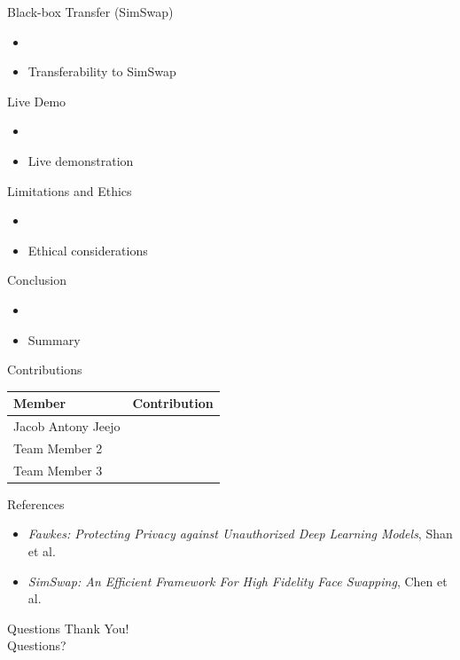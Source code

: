 \documentclass[aspectratio=169]{beamer}
\begin{document}
\begin{frame}{Black-box Transfer (SimSwap)}
    \begin{itemize}
        \item %
        \item Transferability to SimSwap
    \end{itemize}
\end{frame}

\begin{frame}{Live Demo}
    \begin{itemize}
        \item %
        \item Live demonstration
    \end{itemize}
\end{frame}

\begin{frame}{Limitations and Ethics}
    \begin{itemize}
        \item %
        \item Ethical considerations
    \end{itemize}
\end{frame}

\begin{frame}{Conclusion}
    \begin{itemize}
        \item %
        \item Summary
    \end{itemize}
\end{frame}

\begin{frame}{Contributions}
    \begin{table}
        \centering
        \begin{tabular}{ll}
            \toprule
            \textbf{Member} & \textbf{Contribution} \\
            \midrule
            Jacob Antony Jeejo & \\ %
            Team Member 2 & \\ %
            Team Member 3 & \\ %
            \bottomrule
        \end{tabular}
    \end{table}
\end{frame}

\begin{frame}{References}
    \begin{itemize}
        \item \textit{Fawkes: Protecting Privacy against Unauthorized Deep Learning Models}, Shan et al.
        \item \textit{SimSwap: An Efficient Framework For High Fidelity Face Swapping}, Chen et al.
    \end{itemize}
\end{frame}

\begin{frame}{Questions}
    \centering
    \Huge Thank You! \\
    \vspace{1cm}
    \Large Questions?
\end{frame}
\end{document}
